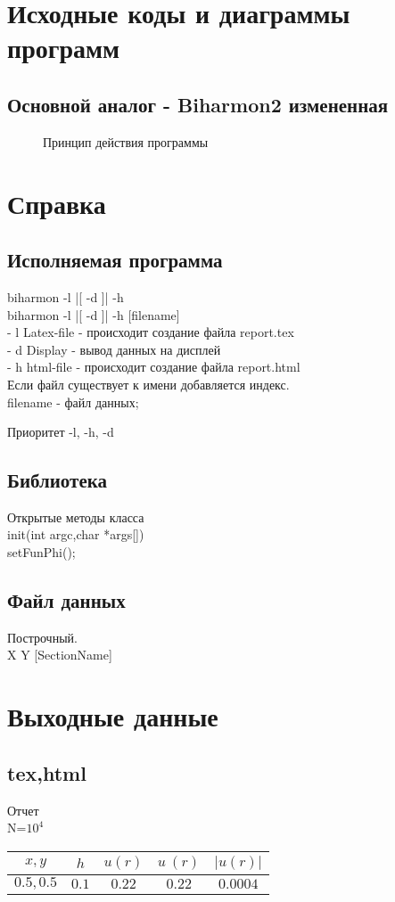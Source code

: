 \chapter{Исходные коды и диаграммы программ}
\section{Основной аналог - Biharmon2 измененная}

\begin{figure}

\caption{Принцип действия программы}
\end{figure}
\chapter{Справка}
\section{Исполняемая программа}
biharmon -l |[ -d ]| -h\\
biharmon -l |[ -d ]| -h [filename]\\
- l	Latex-file - происходит создание файла report.tex\\
- d	Display - вывод данных на дисплей\\
- h	html-file - происходит создание файла report.html\\
Если файл существует к имени добавляется индекс. \\

filename - файл данных;

Приоритет -l, -h, -d \\
\section{Библиотека}
Открытые методы класса\\
init(int argc,char *args[])\\
setFunPhi();\\

\section{Файл данных}
Построчный.\\
X Y [SectionName]
\chapter{Выходные данные}
\section{tex,html}
\begin{center}
Отчет \\
N=$10^{4} $ \\
\begin{tabular}{|c|c|c|c|c|}
\hline
\textbf{$x,y$} & {\textbf{$h$}}& {\textbf{$u(r)$}}& {\textbf{$u^{~}(r)$}}& {\textbf{$|u(r)|$}}\\ \hline
\textbf{$0.5,0.5$} & {\textbf{$0.1$}}& {\textbf{$0.22$}}& {\textbf{$0.22$}}& {\textbf{$0.0004$}}\\ \hline
\end{tabular}
\end{center}
